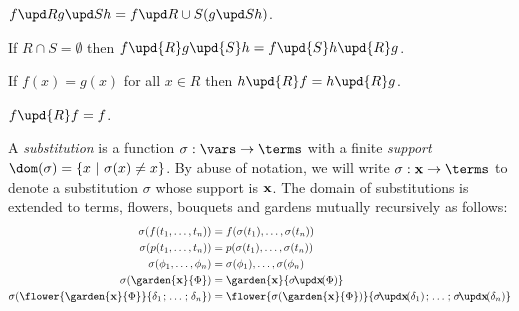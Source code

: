 \begin{fact}[Associativity]
  $\update{\update{f}{R}{g}}{S}{h} = \update{f}{R \cup S}{(\update{g}{S}{h})}$.
\end{fact}

\begin{fact}[Commutativity]
  If $R \cap S = \emptyset$ then $f \upd{R} g \upd{S} h = f \upd{S} h \upd{R}
  g$.
\end{fact}

\begin{fact}[Agreement]
  If $f(x) = g(x)$ for all $x \in R$ then $h \upd{R} f = h \upd{R} g$.
\end{fact}

\begin{fact}[Idempotency]
  $f \upd{R} f = f$.
\end{fact}

\begin{definition}[Substitution]
  A \emph{substitution} is a function $\sigma : \vars \to \terms$ with a finite
  \emph{support} $\dom(\sigma) = \compr{x}{\sigma(x) \not= x}$. By abuse of
  notation, we will write $\sigma : \bx \to \terms$ to denote a substitution
  $\sigma$ whose support is $\mathbf{x}$. The domain of substitutions is extended to
  terms, flowers, bouquets and gardens mutually recursively as follows:
  \begin{align*}
    \sigma(f(t_1, \ldots, t_n)) &= f(\sigma(t_1), \ldots, \sigma(t_n)) \\
    \sigma(p(t_1, \ldots, t_n)) &= p(\sigma(t_1), \ldots, \sigma(t_n)) \\
    \sigma(\phi_1, \ldots, \phi_n) &= \sigma(\phi_1), \ldots, \sigma(\phi_n) \\
    \sigma(\garden{\mathbf{x}}{\Phi}) &=
      \garden{\mathbf{x}}{\restr{\sigma}{\mathbf{x}}(\Phi)} \\
    \sigma(\flower{\garden{\mathbf{x}}{\Phi}}{\delta_1 \sep \ldots \sep \delta_n}) &=
      \flower{\sigma(\garden{\mathbf{x}}{\Phi})}{\restr{\sigma}{\mathbf{x}}(\delta_1) \sep \ldots \sep \restr{\sigma}{\mathbf{x}}(\delta_n)}
  \end{align*}

\end{definition}

